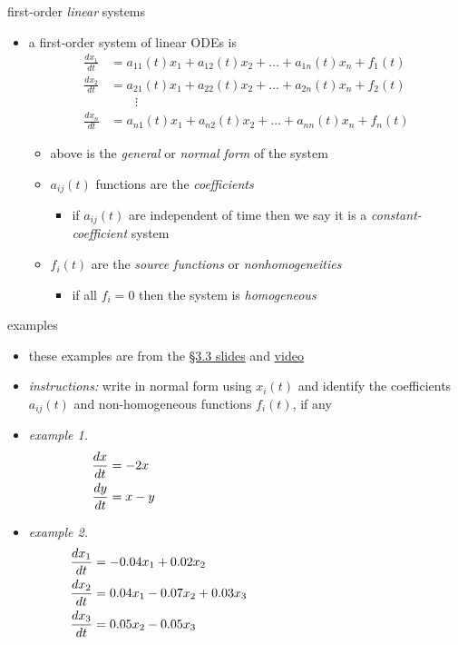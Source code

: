 \documentclass[urlcolor=blue,dvipsnames]{beamer}
\begin{document}
\begin{frame}{first-order \emph{linear} systems}

\begin{itemize}
\item a \alert{first-order system of linear ODEs} is
\begin{align*}
\frac{dx_1}{dt} &= a_{11}(t) x_1 + a_{12}(t) x_2 + \dots + a_{1n}(t) x_n + f_1(t) \\
\frac{dx_2}{dt} &= a_{21}(t) x_1 + a_{22}(t) x_2 + \dots + a_{2n}(t) x_n + f_2(t) \\
                &\qquad \vdots \\
\frac{dx_n}{dt} &= a_{n1}(t) x_1 + a_{n2}(t) x_2 + \dots + a_{nn}(t) x_n + f_n(t)
\end{align*}
     \begin{itemize}
     \item above is the \emph{general} or \emph{normal form} of the system
     \item $a_{ij}(t)$ functions are the \emph{coefficients}
         \begin{itemize}
         \item if $a_{ij}(t)$ are independent of time then we say it is a \emph{constant-coefficient} system
         \end{itemize}
     \item $f_i(t)$ are the \emph{source functions} or \emph{nonhomogeneities}
         \begin{itemize}
         \item if all $f_i=0$ then the system is \emph{homogeneous}
         \end{itemize}
     \end{itemize}
\end{itemize}
\end{frame}


\begin{frame}{examples}

\small
\begin{itemize}
\item these examples are from the \href{https://bueler.github.io/math302/assets/slides/3-3.pdf}{\S3.3 slides} and \href{https://drive.explaineverything.com/thecode/XAAUNGS}{video}
\item \emph{instructions:} write in normal form using $x_i(t)$ and identify the coefficients $a_{ij}(t)$ and non-homogeneous functions $f_i(t)$, if any
\item \emph{example 1.}
\begin{align*}
\frac{dx}{dt} &= - 2 x \hspace{70mm} \\
\frac{dy}{dt} &= x - y
\end{align*}
\item \emph{example 2.}
\begin{align*}
\frac{dx_1}{dt} &= -0.04 x_1 + 0.02 x_2 \hspace{60mm} \\
\frac{dx_2}{dt} &= 0.04 x_1 - 0.07 x_2 + 0.03 x_3 \\
\frac{dx_3}{dt} &= 0.05 x_2 - 0.05 x_3
\end{align*}
\end{itemize}
\end{frame}
\end{document}
